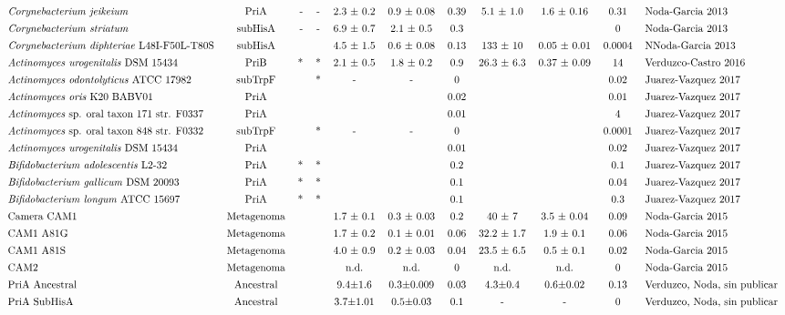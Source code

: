 \documentclass[]{article}
\begin{document}
\begin{landscape}
$${\begin{tabular}{ l c r c c c c c c c l}
\textit{Corynebacterium} \textit{jeikeium} &PriA&-&-&2.3 ± 0.2&0.9 ± 0.08&0.39&5.1 ± 1.0&1.6 ± 0.16&0.31& Noda-Garcia 2013\\ [1ex]    
\textit{Corynebacterium} \textit{striatum} &subHisA&-&-&6.9 ± 0.7&2.1 ± 0.5&0.3&&&0& Noda-Garcia 2013 \\ [1ex]    
\textit{Corynebacterium} \textit{diphteriae}  L48I-F50L-T80S&subHisA&&&4.5 ± 1.5&0.6 ± 0.08&0.13&133 ± 10&0.05 ± 0.01&0.0004&NNoda-Garcia 2013\\ [1ex]    
\textit{Actinomyces} \textit{urogenitalis} DSM 15434&PriB&*&*&2.1 ± 0.5 &1.8 ± 0.2 &0.9&26.3 ± 6.3& 0.37 ± 0.09 &14&Verduzco-Castro 2016\\ [1ex]   
\textit{Actinomyces} \textit{odontolyticus}  ATCC 17982&subTrpF&&*&-&-&0&&&0.02&Juarez-Vazquez 2017\\ [1ex]    
\textit{Actinomyces} \textit{oris} K20 BABV01&PriA&&&&&0.02&&&0.01&Juarez-Vazquez 2017\\ [1ex]    
\textit{Actinomyces} sp. oral taxon 171 str. F0337&PriA&&&&&0.01&&&4&Juarez-Vazquez 2017\\ [1ex]    
\textit{Actinomyces} sp. oral taxon 848 str. F0332&subTrpF&&*&-&-&0&&&0.0001&Juarez-Vazquez 2017\\ [1ex]    
\textit{Actinomyces} \textit{urogenitalis} DSM 15434&PriA&&&&&0.01&&&0.02&Juarez-Vazquez 2017\\ [1ex]    
\textit{Bifidobacterium} \textit{adolescentis} L2-32&PriA&*&*&&&0.2&&&0.1&Juarez-Vazquez 2017\\ [1ex]    
\textit{Bifidobacterium} \textit{gallicum} DSM 20093 &PriA&*&*&&&0.1&&&0.04&Juarez-Vazquez 2017\\ [1ex]    
\textit{Bifidobacterium} \textit{longum} ATCC 15697&PriA&*&*&&&0.1&&&0.3&Juarez-Vazquez 2017\\ [1ex]    
Camera CAM1&Metagenoma&&&1.7 ± 0.1&0.3 ± 0.03&0.2&40 ± 7&3.5 ± 0.04&0.09&Noda-Garcia 2015\\ [1ex]    
CAM1 A81G&Metagenoma&&&1.7 ± 0.2&0.1 ± 0.01&0.06&32.2 ± 1.7&1.9 ± 0.1&0.06&Noda-Garcia 2015\\ [1ex]    
CAM1 A81S&Metagenoma&&&4.0 ± 0.9&0.2 ± 0.03&0.04&23.5 ± 6.5&0.5 ± 0.1&0.02&Noda-Garcia 2015\\ [1ex]    
CAM2&Metagenoma&&&n.d.&n.d.&0&n.d.&n.d.&0&Noda-Garcia 2015\\ [1ex]    
PriA Ancestral&Ancestral&&&9.4±1.6&0.3±0.009&0.03&4.3±0.4&0.6±0.02&0.13&Verduzco, Noda, sin publicar\\ [1ex]    
PriA SubHisA&Ancestral&&&3.7±1.01&0.5±0.03&0.1&-&-&0&Verduzco, Noda, sin publicar\\ [1ex]    

\end{tabular}}$$
\end{landscape}
\end{document}
